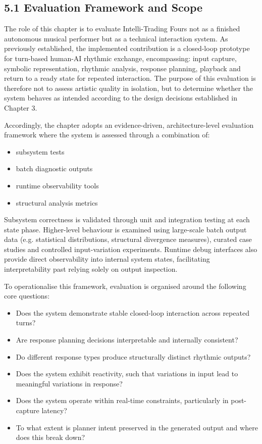 \subsection{5.1 Evaluation Framework and
Scope}\label{evaluation-framework-and-scope}

The role of this chapter is to evaluate Intelli-Trading Fours not as a
finished autonomous musical performer but as a technical interaction
system. As previously established, the implemented contribution is a
closed-loop prototype for turn-based human-AI rhythmic exchange,
encompassing: input capture, symbolic representation, rhythmic analysis,
response planning, playback and return to a ready state for repeated
interaction. The purpose of this evaluation is therefore not to assess
artistic quality in isolation, but to determine whether the system
behaves as intended according to the design decisions established in
Chapter 3.

Accordingly, the chapter adopts an evidence-driven, architecture-level
evaluation framework where the system is assessed through a combination
of:

\begin{itemize}
\item
  subsystem tests
\item
  batch diagnostic outputs
\item
  runtime observability tools
\item
  structural analysis metrics
\end{itemize}

Subsystem correctness is validated through unit and integration testing
at each state phase. Higher-level behaviour is examined using
large-scale batch output data (e.g. statistical distributions,
structural divergence measures), curated case studies and controlled
input-variation experiments. Runtime debug interfaces also provide
direct observability into internal system states, facilitating
interpretability past relying solely on output inspection.

To operationalise this framework, evaluation is organised around the
following core questions:

\begin{itemize}
\item
  Does the system demonstrate stable closed-loop interaction across
  repeated turns?
\item
  Are response planning decisions interpretable and internally
  consistent?
\item
  Do different response types produce structurally distinct rhythmic
  outputs?
\item
  Does the system exhibit reactivity, such that variations in input lead
  to meaningful variations in response?
\item
  Does the system operate within real-time constraints, particularly in
  post-capture latency?
\item
  To what extent is planner intent preserved in the generated output and
  where does this break down?
\end{itemize}

